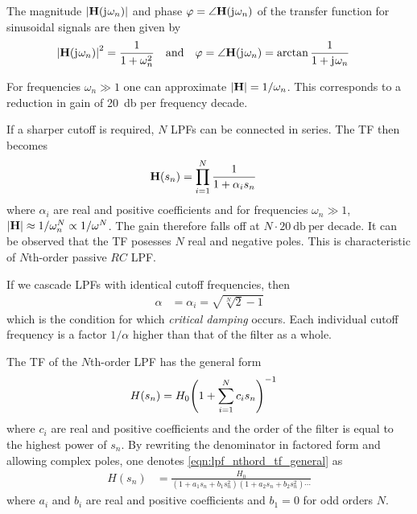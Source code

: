 The magnitude $\abs{\mathbf{H}(\mathrm{j}\mkern1mu\omega_n)}$ and phase $\varphi=\angle\mathbf{H}(\mathrm{j}\mkern1mu\omega_n)$ of the transfer function for sinusoidal signals are then given by
\begin{align}
  \abs{\mathbf{H}(\mathrm{j}\mkern1mu\omega_n)}^2 &= \frac{1}{1+\omega_n^2} &&\text{and} &\varphi &= \angle\mathbf{H}(\mathrm{j}\mkern1mu\omega_n) = \arctan\frac{1}{1 + \mathrm{j}\mkern1mu\omega_n}
\end{align}

For frequencies $\omega_n\gg 1$ one can approximate $\abs{\mathbf{H}}=1/\omega_n$. This corresponds to a reduction in gain of \SI{20}{\decibel} per frequency decade.

If a sharper cutoff is required, $N$ \ac{LPF}s can be connected in series. The \ac{TF} then becomes
\begin{align}
  \mathbf{H}(s_n) &= \prod\limits_{i=1}^{N}\frac{1}{1+\alpha_i s_n}
\end{align}
where $\alpha_i$ are real and positive coefficients and for frequencies $\omega_n\gg 1$, $\abs{\mathbf{H}}\approx 1/\omega_n^N\propto 1/\omega^N$. The gain therefore falls off at $N\cdot\SI{20}{\decibel}\:\text{per decade}$. It can be observed that the \ac{TF} posesses $N$ real and negative poles. This is characteristic of $N$th-order passive $RC$ \ac{LPF}.

If we cascade \ac{LPF}s with identical cutoff frequencies, then
\begin{align}
  \alpha &= \alpha_i = \sqrt{\sqrt[N]{2}-1}
\end{align}
which is the condition for which \emph{critical damping} occurs. Each individual cutoff frequency is a factor $1/\alpha$ higher than that of the filter as a whole.

The \ac{TF} of the $N$th-order \ac{LPF} has the general form
\begin{align}
  H(s_n) &= H_0 \pqty{1 + \sum\limits_{i=1}^N c_i s_n}^{-1} \label{eqn:lpf_nthord_tf_general}
\end{align}
where $c_i$ are real and positive coefficients and the order of the filter is equal to the highest power of $s_n$. By rewriting the denominator in factored form and allowing complex poles, one denotes \autoref{eqn:lpf_nthord_tf_general} as
\begin{align}
  H(s_n) &= \frac{H_0}{(1+a_1s_n+b_1s_n^2)(1+a_2s_n+b_2s_n^2)\cdots} \label{eqn:lpf_nthord_tf_poles}
\end{align}
where $a_i$ and $b_i$ are real and positive coefficients and $b_1=0$ for odd orders $N$.

